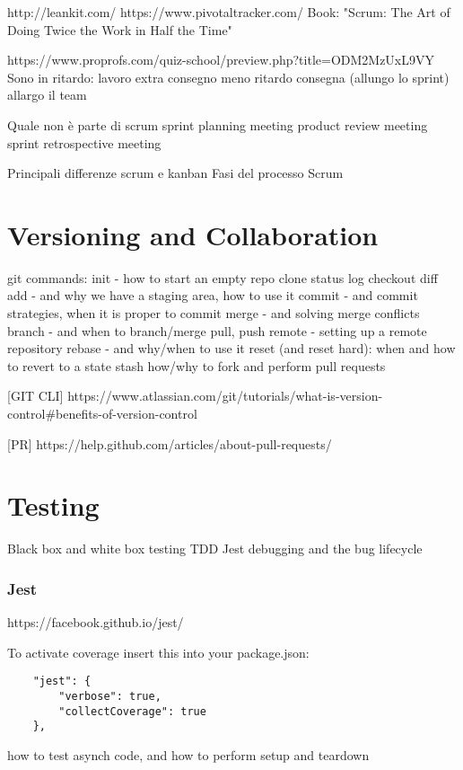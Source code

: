 \begin{itemize}
http://leankit.com/
https://www.pivotaltracker.com/
Book: "Scrum: The Art of Doing Twice the Work in Half the Time"

https://www.proprofs.com/quiz-school/preview.php?title=ODM2MzUxL9VY
Sono in ritardo:
	lavoro extra
	consegno meno
	ritardo consegna (allungo lo sprint)
	allargo il team

Quale non è parte di scrum
	sprint planning meeting
	product review meeting
	sprint retrospective meeting

Principali differenze scrum e kanban 
Fasi del processo Scrum

\chapter{Versioning and Collaboration}
git commands:
	init - how to start an empty repo
	clone
	status
	log
	checkout
	diff
	add - and why we have a staging area, how to use it
	commit - and commit strategies, when it is proper to commit
	merge - and solving merge conflicts
	branch - and when to branch/merge
	pull, push
	remote - setting up a remote repository
	rebase - and why/when to use it
	reset (and reset hard): when and how to revert to a state
	stash
	how/why to fork and perform pull requests

[GIT CLI]
https://www.atlassian.com/git/tutorials/what-is-version-control#benefits-of-version-control

[PR]
https://help.github.com/articles/about-pull-requests/


\chapter{Testing}

	Black box and white box testing 
	TDD
	Jest 
	debugging and the bug lifecycle
\subsection{Jest}

https://facebook.github.io/jest/

To activate coverage insert this into your package.json:
\begin{lstlisting}
	"jest": {
		"verbose": true,
		"collectCoverage": true
	},
\end{lstlisting}

how to test asynch code, and how to perform setup and teardown


\end{itemize}
